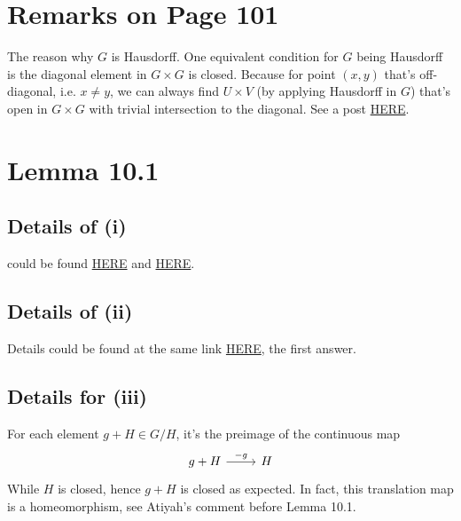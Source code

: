 
\section{Remarks on Page 101}

The reason why $G$ is Hausdorff. 
One equivalent condition for $G$ being Hausdorff is the diagonal element in $G\times G$ is closed. 
Because for point $(x,y)$ that's off-diagonal, i.e. $x\neq y$, we can always find $U\times V$ (by applying Hausdorff in $G$) that's open in $G\times G$ with trivial intersection to the diagonal. See a post \href{https://math.stackexchange.com/questions/136922/x-is-hausdorff-if-and-only-if-the-diagonal-of-x-times-x-is-closed}{HERE}.

\section{Lemma 10.1}

\subsection{Details of (i)}
could be found \href{https://math.stackexchange.com/questions/13368/intersection-of-neighborhoods-of-0-subgroup}{HERE} and \href{https://math.stackexchange.com/questions/174955/intersection-of-all-neighborhoods-of-zero-is-a-subgroup}{HERE}.

\subsection{Details of (ii)}
Details could be found at the same link \href{https://math.stackexchange.com/questions/174955/intersection-of-all-neighborhoods-of-zero-is-a-subgroup}{HERE}, the first answer.

\subsection{Details for (iii)}
For each element $g+H\in G/H$, it's the preimage of the continuous map
\[\begin{tikzcd}
	{g+H} & H
	\arrow["{-g}", from=1-1, to=1-2]
\end{tikzcd}\] While $H$ is closed, hence $g+H$ is closed as expected. In fact, this translation map is a homeomorphism, see Atiyah's comment before Lemma 10.1.


